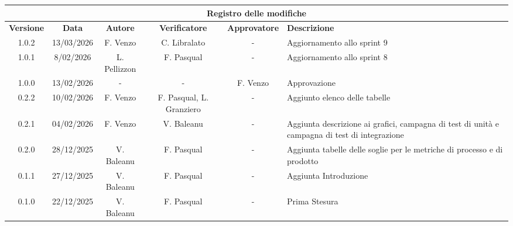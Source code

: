 \documentclass[10pt, letterpaper]{article}
\begin{document}
\begin{center}
    \begin{tabularx}{\textwidth}{|c|c|c|c|c|X|}
        \hline
        \multicolumn{6}{|c|}{\textbf{Registro delle modifiche}}                                                                                                                                                                    \\
        \hline
        \rowcolor{lightgray} \textbf{Versione} & \textbf{Data} & \textbf{Autore} & \textbf{Verificatore}    & \textbf{Approvatore} & \textbf{Descrizione}\\
        \hline
        1.0.2                                  & 13/03/2026    & F. Venzo & C. Libralato & - & Aggiornamento allo sprint 9\\
        \hline
        1.0.1                                  & 8/02/2026    & L. Pellizzon & F. Pasqual & - & Aggiornamento allo sprint 8\\
        \hline
        1.0.0                                  & 13/02/2026    & -               & -                        & F. Venzo             & Approvazione                                                                                  \\
        \hline
        0.2.2                                  & 10/02/2026    & F. Venzo        & F. Pasqual, L. Granziero & -                    & Aggiunto elenco delle tabelle                                                                 \\
        \hline
        0.2.1                                  & 04/02/2026    & F. Venzo        & V. Baleanu               & -                    & Aggiunta descrizione ai grafici, campagna di test di unità e campagna di test di integrazione \\
        \hline
        0.2.0                                  & 28/12/2025    & V. Baleanu      & F. Pasqual               & -                    & Aggiunta tabelle delle soglie per le metriche di processo e di prodotto                       \\
        \hline
        0.1.1                                  & 27/12/2025    & V. Baleanu      & F. Pasqual               & -                    & Aggiunta Introduzione                                                                         \\
        \hline
        0.1.0                                  & 22/12/2025    & V. Baleanu      & F. Pasqual               & -                    & Prima Stesura                                                                                 \\
        \hline
    \end{tabularx}
\end{center}
\end{document}

